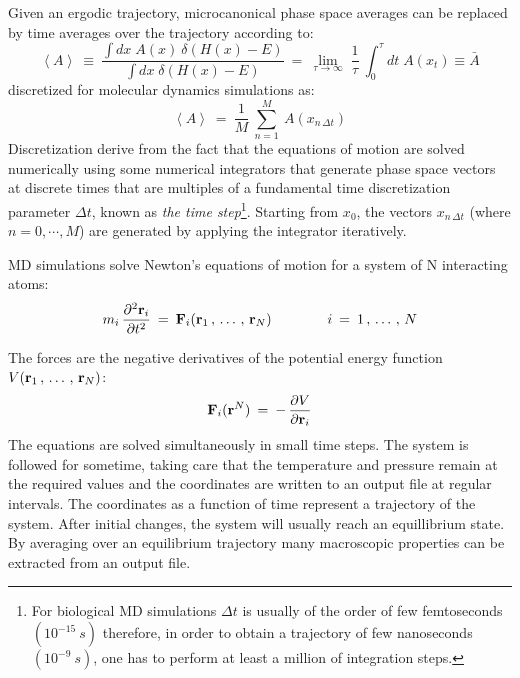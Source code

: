 Given an ergodic trajectory, microcanonical phase space averages can be replaced by time averages over the trajectory according to:
\begin{equation}
\left< A \right> \:\equiv\: 
\frac{\int dx \; A(x) \: \delta(H ( x ) - E)}{\int dx \; \delta(H ( x ) - E)} \:=\: 
\lim_{\tau \rightarrow \infty} \; \frac{1}{\tau} \: \int_0^\tau dt \; A(x_t) \equiv \bar{A}
\end{equation}
discretized for molecular dynamics simulations as:
\begin{equation*}
\left< A \right> \:=\: \frac{1}{M} \: \sum_{n =1}^M \: A(x_{n \, \Delta t})
\end{equation*}
Discretization derive from the fact that the equations of motion are solved numerically using some numerical integrators that generate phase space vectors at discrete times that are multiples of a fundamental time discretization parameter $\Delta t$, known as \textit{the time step}\footnote{For biological MD simulations $\Delta t$ is usually of the order of few femtoseconds $(10^{-15} \: s)$ therefore, in order to obtain a trajectory of few nanoseconds $(10^{-9} \: s)$, one has to perform at least a million of integration steps.}. Starting from $x_0$, the vectors $x_{n \, \Delta t}$ (where $n = 0, \cdots , M$) are generated by applying the integrator iteratively.


MD simulations solve Newton's equations of motion for a system of N interacting atoms:
\begin{equation}
m_i \, \frac{\partial^2 \bold{r}_i}{\partial t^2} \: = \: \bold{F}_i (\bold{r}_1 \, , \, \dots \, , \, \bold{r}_N)
\qquad\qquad i \:=\: 1 \, , \, \dots \, , \, N
\end{equation}

The forces are the negative derivatives of the potential energy function $V (\bold{r}_1 \, , \, \dots \, , \, \bold{r}_N)$:
\begin{equation}
\bold{F}_i (\bold{r}^N) \:=\: - \, \frac{\partial V}{\partial \bold{r}_i}
\end{equation}
The equations are solved simultaneously in small time steps. The system is followed for sometime, taking care that the temperature and pressure remain at the required values and the coordinates are written to an output file at regular intervals. The coordinates as a function of time represent a trajectory of the system. After initial changes, the system will usually reach an equillibrium state. By averaging over an equilibrium trajectory many macroscopic properties can be extracted from an output file.


